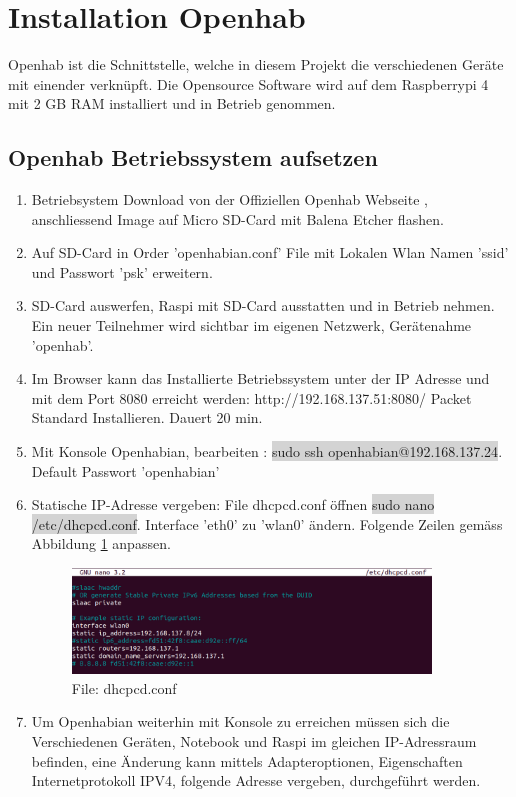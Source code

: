 \clearpage
\section{Installation Openhab}\label{sec:Openhab}
Openhab ist die Schnittstelle, welche in diesem Projekt die verschiedenen Geräte mit einender verknüpft. Die Opensource Software wird auf dem Raspberrypi 4 mit 2 GB RAM installiert und in Betrieb genommen. 

\subsection{Openhab Betriebssystem aufsetzen}
\begin{enumerate}
	\item Betriebsystem Download von der Offiziellen Openhab Webseite \cite{noauthor_download_nodate-1}, anschliessend Image auf Micro SD-Card mit Balena Etcher flashen.
   \item Auf SD-Card in Order 'openhabian.conf' File mit Lokalen Wlan Namen 'ssid' und Passwort 'psk' erweitern.
   \item SD-Card auswerfen, Raspi mit SD-Card ausstatten und in Betrieb nehmen. Ein neuer Teilnehmer wird sichtbar im eigenen Netzwerk, Gerätenahme 'openhab'.
   \item Im Browser kann das Installierte Betriebssystem unter der IP Adresse und mit dem Port 8080 erreicht werden: http://192.168.137.51:8080/ Packet Standard Installieren. Dauert 20 min.
   \item Mit Konsole Openhabian, bearbeiten : \colorbox{lightgray}{sudo ssh openhabian@192.168.137.24}. \\
   Default Passwort 'openhabian'
   \item Statische IP-Adresse vergeben: File dhcpcd.conf öffnen \colorbox{lightgray}{sudo nano /etc/dhcpcd.conf}. Interface 'eth0' zu 'wlan0' ändern. Folgende Zeilen gemäss Abbildung \ref{pic: dhcpcd} anpassen. 
   \begin{figure}[H]
   	\centering
   	\includegraphics[width=0.9\textwidth]{graphics/dhcpcd.png}
   	\caption{File: dhcpcd.conf} 	
   	\label{pic: dhcpcd}
   \end{figure} 
\item Um Openhabian weiterhin mit Konsole zu erreichen müssen sich die Verschiedenen Geräten, Notebook und Raspi im gleichen IP-Adressraum befinden, eine Änderung kann mittels Adapteroptionen, Eigenschaften Internetprotokoll IPV4, folgende Adresse vergeben, durchgeführt werden.


\end{enumerate}
